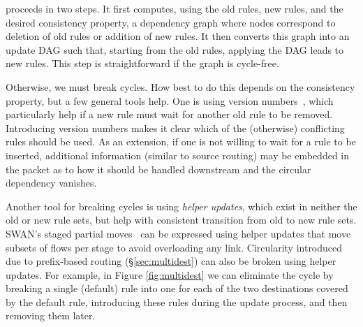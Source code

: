  proceeds in two steps. It first computes, using the old rules, new rules, and the desired consistency property, a dependency graph where nodes correspond to deletion of old rules or addition of new rules. It then converts this graph into an update DAG such that, starting from the old rules, applying the DAG leads to new rules. This step is straightforward if the graph is cycle-free.

Otherwise, we must break cycles. How best to do this depends on the consistency property, but a few general tools help. One is using version numbers~\cite{safeupdate}, which particularly help if a new rule must wait for another old rule to be removed. Introducing version numbers makes it clear which of the (otherwise) conflicting rules should be used. As an extension, if one is not willing to wait for a rule to be inserted, additional information (similar to source routing) may be embedded in the packet as to how it should be handled downstream  and the circular dependency vanishes.

Another tool for breaking cycles is using {\em helper updates}, which exist in neither the old or new rule sets, but help with consistent transition from old to new rule sets. SWAN's staged partial moves~\cite{swan} can be expressed using helper updates that move subsets of flows per stage to avoid overloading any link. Circularity introduced due to prefix-based routing (\S\ref{sec:multidest}) can also be broken using helper updates. For example, in Figure \ref{fig:multidest} we can eliminate the cycle by breaking a single (default) rule into one for each of the two destinations covered by the default rule, introducing these rules during the update process, and then removing them later.

%

